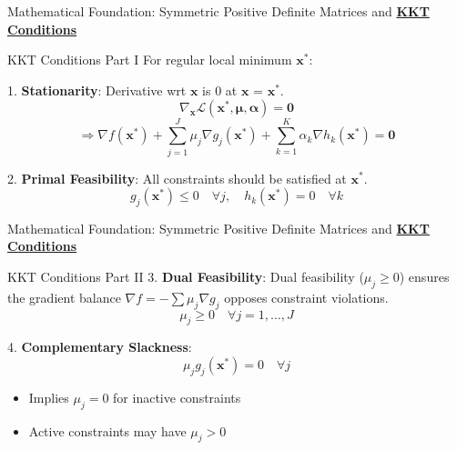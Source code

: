 \documentclass{beamer}
\begin{document}
\begin{frame}{{Mathematical Foundation: Symmetric Positive Definite Matrices and \textbf{\underline{KKT Conditions}}}}
    \begin{block}{KKT Conditions Part I}
        For regular local minimum $\bm{x}^*$:

        1. \textbf{Stationarity}:
        Derivative wrt $\bm{x}$ is 0 at $\bm{x}$ = $\bm{x}^*$.
        \[
            \nabla_{\bm{x}} \mathcal{L}(\bm{x}^*, \bm{\mu}, \bm{\alpha}) = \bm{0}
        \]
        \[
            \Rightarrow \nabla f(\bm{x}^*) + \sum_{j=1}^J \mu_j \nabla g_j(\bm{x}^*) + \sum_{k=1}^K \alpha_k \nabla h_k(\bm{x}^*) = \bm{0}
        \]

        2. \textbf{Primal Feasibility}:
        All constraints should be satisfied at $\bm{x^*}$.
        \[
            g_j(\bm{x}^*) \leq 0 \quad \forall j, \quad h_k(\bm{x}^*) = 0 \quad \forall k
        \]
    \end{block}
\end{frame}

\begin{frame}{{Mathematical Foundation: Symmetric Positive Definite Matrices and \textbf{\underline{KKT Conditions}}}}
    \begin{block}{KKT Conditions Part II}
        3. \textbf{Dual Feasibility}: 
        Dual feasibility ($\mu_j \geq 0$) ensures the gradient balance $\nabla f = -\sum \mu_j \nabla g_j$ opposes constraint violations.
        \[
            \mu_j \geq 0 \quad \forall j = 1,\ldots,J
        \]

        4. \textbf{Complementary Slackness}:
        \[
            \mu_j g_j(\bm{x}^*) = 0 \quad \forall j
        \]
        \begin{itemize}
            \item Implies $\mu_j = 0$ for inactive constraints
            \item Active constraints may have $\mu_j > 0$
        \end{itemize}
    \end{block}
\end{frame}
\end{document}

